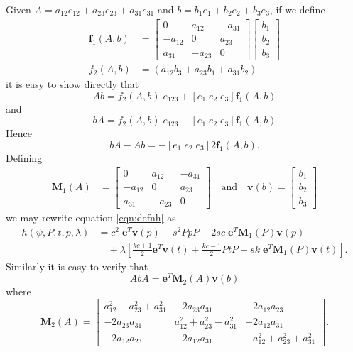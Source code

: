 Given $A = a_{12}e_{12} + a_{23}e_{23} + a_{31}e_{31}$ and
$b = b_1e_1 + b_2e_2 + b_3e_3$, if we define
\begin{align*}
\mathbf{f}_1(A,b) &=
\left[ 
\begin{array}{ccc}
0 & a_{12} & - a_{31} \\
- a_{12} & 0 & a_{23}\\
a_{31} & - a_{23} & 0 
\end{array} 
\right]  
\left[ 
\begin{array}{c}
b_1 \\ b_2 \\ b_3
\end{array} 
\right]  
\\
f_2(A,b) &= (a_{12}b_{3} + a_{23}b_1 + a_{31}b_2) 
\end{align*}
it is easy to show directly that
\[
Ab =
f_2(A,b)\;e_{123} +
\left[ e_1 \; e_2 \; e_3 \right]
 \mathbf{f}_1(A,b)
\]
and
\[
bA =
f_2(A,b)\;e_{123} - 
\left[ e_1 \; e_2 \; e_3 \right]
\mathbf{f}_1(A,b)
\]
Hence
\[
bA - Ab = -
\left[ e_1 \; e_2 \; e_3 \right]
2\mathbf{f}_1(A,b).
\]
Defining
\begin{align*}
\mathbf{M}_1(A) &= \left[ 
\begin{array}{ccc}
0 & a_{12} & - a_{31} \\
- a_{12} & 0 & a_{23}\\
a_{31} & - a_{23} & 0 
\end{array} 
\right]  \quad\mathrm{and}\quad
\mathbf{v}(b) = \left[ 
\begin{array}{c}
b_1 \\
b_2 \\
b_3 
\end{array} 
\right]  
\end{align*}
we may rewrite equation \ref{eqn:defnh} as
\begin{align*}
h(\psi, P, t, p, \lambda) &= c^2\;\mathbf{e}^T\mathbf{v}(p) - s^2PpP + 2sc\;\mathbf{e}^T\mathbf{M}_1(P)\mathbf{v}(p) \\
&\quad+ \lambda\left[ 
 \frac{kc+1}{2} \mathbf{e}^T\mathbf{v}(t) + \frac{kc-1}{2} PtP
+ sk\;\mathbf{e}^T\mathbf{M}_1(P)\mathbf{v}(t)
\right].
\end{align*}
Similarly it is easy to verify that
\[
AbA = \mathbf{e}^T \mathbf{M}_2(A) \mathbf{v}(b)
\]
where
\[
\mathbf{M}_2(A)  =
\left[
\begin{array}{ccc}
a^2_{12} - a^2_{23} + a^2_{31} &  - 2a_{23}a_{31} & - 2a_{12}a_{23} \\
- 2a_{23}a_{31} & a^2_{12} + a^2_{23} - a^2_{31} & - 2a_{12}a_{31}  \\
- 2a_{12}a_{23} & - 2a_{12}a_{31} &  -a^2_{12} + a^2_{23} + a^2_{31} 
\end{array}
\right].
\]
